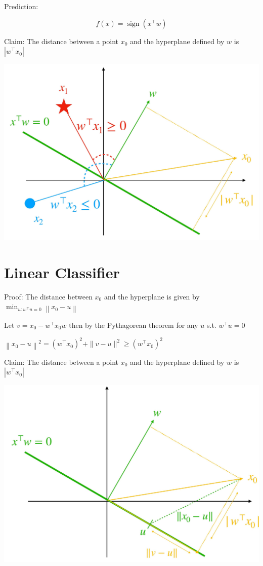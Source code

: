\documentclass[10pt]{article}
\begin{document}
Prediction:

$$
f(x)=\operatorname{sign}\left(x^{\top} w\right)
$$

Claim: The distance between a point $x_{0}$ and the hyperplane defined by $w$ is $\left|w^{\top} x_{0}\right|$

\begin{center}
\includegraphics[max width=\textwidth]{2023_12_30_bf5d191916c1e78fa6d6g-04}
\end{center}

\section*{Linear Classifier}
Proof: The distance between $x_{0}$ and the hyperplane is given by $\min _{u: w^{\top} u=0}\left\|x_{0}-u\right\|$

Let $v=x_{0}-w^{\top} x_{0} w$ then by the Pythagorean theorem for any $u$ s.t. $w^{\top} u=0$

$\left\|x_{0}-u\right\|^{2}=\left(w^{\top} x_{0}\right)^{2}+\|v-u\|^{2} \geq\left(w^{\top} x_{0}\right)^{2}$

Claim: The distance between a point $x_{0}$ and the hyperplane defined by $w$ is $\left|w^{\top} x_{0}\right|$

\begin{center}
\includegraphics[max width=\textwidth]{2023_12_30_bf5d191916c1e78fa6d6g-05}
\end{center}
\end{document}
